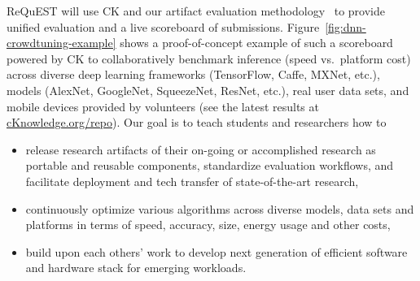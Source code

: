 ReQuEST will use CK and our artifact evaluation methodology~\cite{ctuning-ae1} 
to provide unified evaluation and a live scoreboard of submissions. 
%
Figure~\ref{fig:dnn-crowdtuning-example} shows a proof-of-concept example of such a
scoreboard powered by CK to collaboratively benchmark inference (speed vs.\ platform cost) 
across diverse deep learning frameworks (TensorFlow, Caffe, MXNet, etc.), 
models (AlexNet, GoogleNet, SqueezeNet, ResNet, etc.), real user data sets, and mobile devices 
provided by volunteers (see the latest results at \href{http://cknowledge.org/repo}{cKnowledge.org/repo}).
%
Our goal is to teach students and researchers how to 
\begin{itemize}
  \item release research artifacts of their on-going or accomplished research
as portable and reusable components, standardize evaluation workflows, 
and facilitate deployment and tech transfer of state-of-the-art research,
  \item continuously optimize various algorithms
across diverse models, data sets and platforms in terms of speed, accuracy,
size, energy usage and other costs,
  \item build upon each others' work to develop next generation 
of efficient software and hardware stack for emerging workloads.
\end{itemize}

